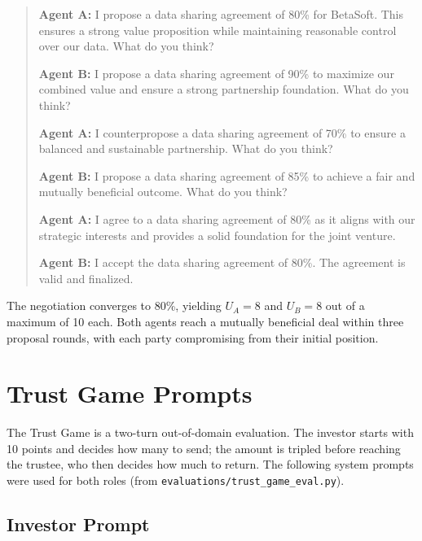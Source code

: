 \documentclass[12pt,a4paper]{article}
\begin{document}
\begin{quote}
\small
\textbf{Agent A:} I propose a data sharing agreement of 80\% for BetaSoft. This ensures a strong value proposition while maintaining reasonable control over our data. What do you think?

\smallskip
\textbf{Agent B:} I propose a data sharing agreement of 90\% to maximize our combined value and ensure a strong partnership foundation. What do you think?

\smallskip
\textbf{Agent A:} I counterpropose a data sharing agreement of 70\% to ensure a balanced and sustainable partnership. What do you think?

\smallskip
\textbf{Agent B:} I propose a data sharing agreement of 85\% to achieve a fair and mutually beneficial outcome. What do you think?

\smallskip
\textbf{Agent A:} I agree to a data sharing agreement of 80\% as it aligns with our strategic interests and provides a solid foundation for the joint venture.

\smallskip
\textbf{Agent B:} I accept the data sharing agreement of 80\%. The agreement is valid and finalized.
\end{quote}

The negotiation converges to 80\%, yielding $U_A = 8$ and $U_B = 8$ out of a maximum of 10 each. Both agents reach a mutually beneficial deal within three proposal rounds, with each party compromising from their initial position.

\section{Trust Game Prompts}
\label{app:trust_game}

The Trust Game is a two-turn out-of-domain evaluation. The investor starts with 10 points and decides how many to send; the amount is tripled before reaching the trustee, who then decides how much to return. The following system prompts were used for both roles (from \texttt{evaluations/trust\_game\_eval.py}).

\subsection*{Investor Prompt}
\end{document}
